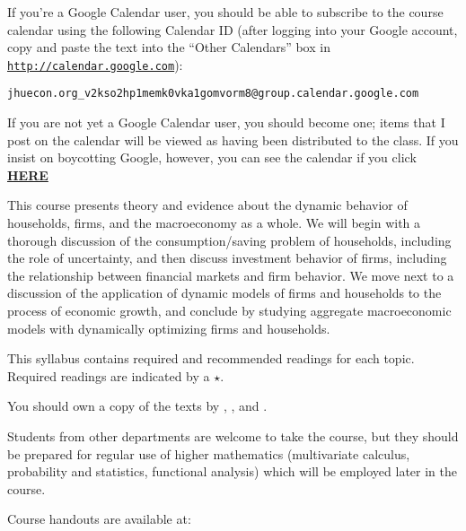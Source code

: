 \documentclass{econtex}
\begin{document}
\begin{small}

If you're a Google Calendar user, you should be able to subscribe to the course calendar using the following Calendar ID (after logging into your Google account, copy and paste the text into the ``Other Calendars'' box in \href{http://calendar.google.com}{\texttt{http://calendar.google.com}}):

\medskip
\centerline{\texttt{jhuecon.org\_v2kso2hp1memk0vka1gomvorm8@group.calendar.google.com}}
\medskip

If you are not yet a Google Calendar user, you should become one; items that I post on the calendar will be viewed as having been distributed to the class.  If you insist on boycotting Google, however, you can see the calendar if you click \href{https://www.google.com/calendar/embed?src=jhuecon.org_v2kso2hp1memk0vka1gomvorm8\%40group.calendar.google.com\&ctz=America/New_York}{\bf HERE}

\medskip

\end{small}

\medskip\medskip


This course presents theory and evidence about the dynamic behavior of
households, firms, and the macroeconomy as a whole.  We will begin
with a thorough discussion of the consumption/saving problem of
households, including the role of uncertainty, and then discuss
investment behavior of firms, including the relationship between
financial markets and firm behavior.  We move next to a discussion of
the application of dynamic models of firms and households to the
process of economic growth, and conclude by studying aggregate
macroeconomic models with dynamically optimizing firms and households.

This syllabus contains required and recommended readings for each
topic.  Required readings are indicated by a $\star$. 

You should own a copy of the texts by \cite{blanchard&fischer:text}, \cite{deatonUnderstandingC}, 
\cite{romer:text} and \cite{lsRecurse}.

{\small Students from other departments are welcome to take the course, but 
they should be prepared for regular use of higher mathematics (multivariate
calculus, probability and statistics, functional analysis) which will be employed
later in the course.}

\medskip\medskip
\noindent Course handouts are available at: 
\medskip
\end{document}
